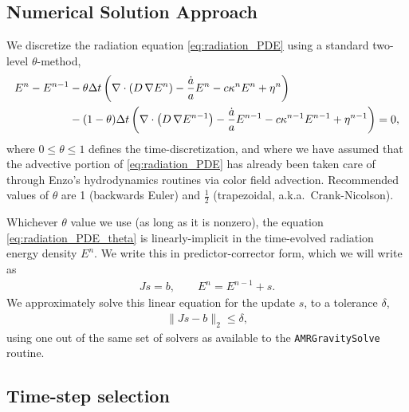 \documentclass[letterpaper,10pt]{article}
\renewcommand{\(}{\left(}
\renewcommand{\)}{\right)}
\newcommand{\dt}{\Delta t}
\begin{document}
\subsection{Numerical Solution Approach}
\label{sec:AMRFLDSplit_rad_solve}

We discretize the radiation equation \eqref{eq:radiation_PDE} using a
standard two-level $\theta$-method,
\begin{align}
  \label{eq:radiation_PDE_theta}
  E^n - E^{n-1} &- \theta\dt\left(\nabla\cdot\(D\,\nabla E^n\) - \frac{\dot{a}}{a} E^n -
    c\kappa^n E^n + \eta^n\right) \\ 
  \notag
  & - (1-\theta)\dt\left(\nabla\cdot\(D\,\nabla E^{n-1}\) - \frac{\dot{a}}{a} E^{n-1} -
    c\kappa^{n-1} E^{n-1} + \eta^{n-1}\right) = 0,
\end{align}
where $0\le\theta\le 1$ defines the time-discretization, and where we
have assumed that the advective portion of \eqref{eq:radiation_PDE}
has already been taken care of through Enzo's hydrodynamics routines
via color field advection.  Recommended values of $\theta$ are 1
(backwards Euler) and $\frac12$ (trapezoidal, a.k.a.~Crank-Nicolson).

Whichever $\theta$ value we use (as long as it is nonzero), the
equation \eqref{eq:radiation_PDE_theta} is linearly-implicit in the
time-evolved radiation energy density $E^n$.  We write this in
predictor-corrector form, which we will write as
\begin{align}
\label{eq:linear_system}
  J s = b, \qquad E^n = E^{n-1} + s.
\end{align}
We approximately solve this linear equation for the update $s$,
to a tolerance $\delta$,
\begin{align}
\label{eq:linear_system_approx}
  \| J s - b \|_2 \le \delta,
\end{align}
using one out of the same set of solvers as available to the 
{\tt AMRGravitySolve} routine.




\subsection{Time-step selection}
\label{sec:AMRFLDSplit_dt_selection}
\end{document}
